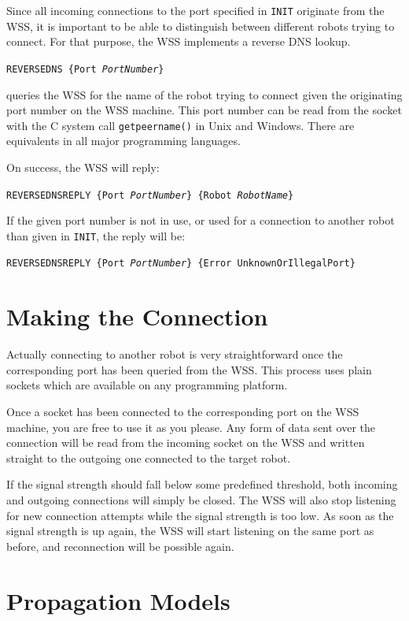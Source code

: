 \documentclass[11pt,a4paper]{article}
\begin{document}
Since all incoming connections to the port specified in \texttt{INIT} originate from the WSS, it is important to be able to distinguish between different robots trying to connect. For that purpose, the WSS implements a reverse DNS lookup.

\texttt{REVERSEDNS \{Port \textit{PortNumber}\}}

queries the WSS for the name of the robot trying to connect given the originating port number on the WSS machine. This port number can be read from the socket with the C system call \texttt{getpeername()} in Unix and Windows. There are equivalents in all major programming languages.

On success, the WSS will reply:

\texttt{REVERSEDNSREPLY \{Port \textit{PortNumber}\} \{Robot \textit{RobotName}\}}

If the given port number is not in use, or used for a connection to another robot than given in \texttt{INIT}, the reply will be:

\texttt{REVERSEDNSREPLY \{Port \textit{PortNumber}\} \{Error UnknownOrIllegalPort\}}

\section{Making the Connection}

Actually connecting to another robot is very straightforward once the corresponding port has been queried from the WSS. This process uses plain sockets which are available on any programming platform.

Once a socket has been connected to the corresponding port on the WSS machine, you are free to use it as you please. Any form of data sent over the connection will be read from the incoming socket on the WSS and written straight to the outgoing one connected to the target robot.

If the signal strength should fall below some predefined threshold, both incoming and outgoing connections will simply be closed. The WSS will also stop listening for new connection attempts while the signal strength is too low. As soon as the signal strength is up again, the WSS will start listening on the same port as before, and reconnection will be possible again.

\section{Propagation Models}
\label{sec:PropagationModel}
\end{document}

